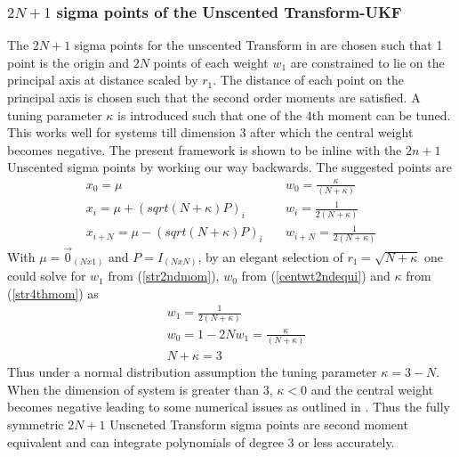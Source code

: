 \documentclass[letterpaper, 10 pt, conference]{ieeeconf}  %
\begin{document}
\subsubsection{$2N+1$ sigma points of the Unscented Transform-UKF}
The $2N+1$ sigma points for the unscented Transform in \cite{c8} are chosen such that 1 point is the origin and $2N$ points of each weight $w_1$ are constrained to lie on the principal axis at distance scaled by $r_1$. The distance of each point on the principal axis is chosen such that the second order moments are satisfied. A tuning parameter $\kappa$ is introduced such that one of the 4th moment can be tuned. This works well for systems till dimension 3 after which the central weight becomes negative. The present framework is shown to be inline with the $2n+1$ Unscented sigma points by working our way backwards. The suggested points are
\setlength{\arraycolsep}{0.0em}
\begin{eqnarray}
x_0=\mu \quad &w_0=\frac{\kappa}{(N+\kappa)}\\
x_i=\mu+(sqrt{(N+\kappa)P})_i\quad  &w_i=\frac{1}{2(N+\kappa)}\\
x_{i+N}=\mu-(sqrt{(N+\kappa)P})_i\quad 	 &w_{i+N}=\frac{1}{2(N+\kappa)}
\end{eqnarray}
\setlength{\arraycolsep}{5pt}
With $\mu=\vec{0}_{(Nx1)}$ and $P=I_{(NxN)}$, by an elegant selection of $r_1=\sqrt{N+\kappa}$ one could solve for $w_1$ from (\ref{str2ndmom}), $w_0$ from (\ref{centwt2ndequi}) and $\kappa$ from (\ref{str4thmom}) as
 \setlength{\arraycolsep}{0.0em}
\begin{eqnarray}
&w_1=\frac{1}{2(N+\kappa)}\\
&w_0=1-2Nw_1=\frac{\kappa}{(N+\kappa)}\\
&N+\kappa =3
\end{eqnarray}
\setlength{\arraycolsep}{5pt}
Thus under a normal distribution assumption the tuning parameter $\kappa=3-N$. When the dimension of system is greater than 3, $\kappa<0$ and the central weight becomes negative leading to some numerical issues as outlined in \cite{c1}. Thus the fully symmetric $2N+1$ Unscneted Transform sigma points are second moment equivalent and can integrate polynomials of degree 3 or less accurately. 


\end{document}
